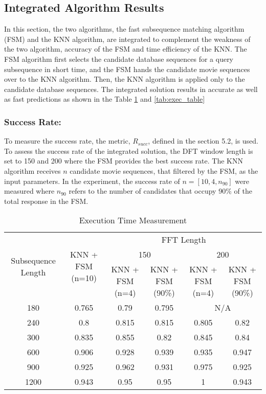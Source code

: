 \subsection{Integrated Algorithm Results}

In this section, the two algorithms, the fast subsequence matching algorithm (FSM) and the KNN algorithm, are integrated to complement the weakness of the two algorithm, accuracy of the FSM and time efficiency of the KNN. The FSM algorithm first selects the candidate database sequences for a query subsequence in short time, and the FSM hands the candidate movie sequences over to the KNN algorithm. Then, the KNN algorithm is applied only to the candidate database sequences. The integrated solution results in accurate as well as fast predictions as shown in the Table \ref{tab:succ_int_table} and \ref{tab:exec_table}

\subsubsection{Success Rate:} To measure the success rate, the metric, $R_{succ}$, defined in the section 5.2, is used. To assess the success rate of the integrated solution, the DFT window length is set to 150 and 200 where the FSM provides the best success rate. The KNN algorithm receives $n$ candidate movie sequences, that filtered by the FSM, as the input parameters. In the experiment, the success rate of $n = [10, 4, n_{90}]$ were measured where $n_{90}$ refers to the number of candidates that occupy 90\% of the total response in the FSM.

\begin{table}[h!]
\begin{center}
\begin{tabular}{|c| c| c| c| c| c| }
\hline
\multirow{3}{*}{Subsequence Length} & \multirow{3}{*}{KNN + FSM (n=10)} & \multicolumn{4}{c|}{FFT Length} \\
\cline{3-6}
   & & \multicolumn{2}{c|}{150}  & \multicolumn{2}{c|}{200}\\
\cline{3-6}
  & &KNN + FSM (n=4) & KNN + FSM (90\%) &KNN + FSM (n=4)& KNN + FSM (90\%)\\
\hline
180 & 0.765 & 0.79 & 0.795 &  \multicolumn{2}{c|}{N/A}\\
\cline{5-6}
240 & 0.8 & 0.815 & 0.815 & 0.805 &0.82
\tabularnewline
300 & 0.835 & 0.855 & 0.82 & 0.845 & 0.84
\tabularnewline
600 & 0.906 &0.928 & 0.939& 0.935& 0.947
\tabularnewline
900 & 0.925 & 0.962 & 0.931 & 0.975&0.925
\tabularnewline
1200 & 0.943 & 0.95 & 0.95 & 1&0.943
\tabularnewline
\hline
\end{tabular}
\end{center}
\caption{Execution Time Measurement}
\label{tab:succ_int_table}
\end{table}

